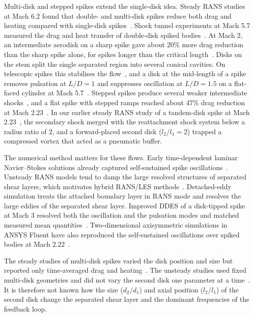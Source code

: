 \documentclass[11pt,a4paper]{article}
\newcommand{\ltl}{l_2/l_1}
\newcommand{\dtd}{d_2/d_1}
\begin{document}
Multi-disk and stepped spikes extend the single-disk idea. Steady RANS studies at Mach 6.2 found that double- and multi-disk spikes reduce both drag and heating compared with single-disk spikes~\cite{Yadav2013aerothermodynamics,Yadav2018numerical}. Shock tunnel experiments at Mach 5.7 measured the drag and heat transfer of double-disk spiked bodies~\cite{Narayana2019experimental,Narayana2023drag}. At Mach 2, an intermediate aerodisk on a sharp spike gave about 20\% more drag reduction than the sharp spike alone, for spikes longer than the critical length~\cite{Tembhurnikar2020effect,Jadhav2024effect}. Disks on the stem split the single separated region into several conical cavities. On telescopic spikes this stabilises the flow~\cite{Kobayashi2007experimental}, and a disk at the mid-length of a spike removes pulsation at $L/D = 1$ and suppresses oscillation at $L/D = 1.5$ on a flat-faced cylinder at Mach 5.7~\cite{Narayana2020attenuation}. Stepped spikes produce several weaker intermediate shocks~\cite{Kumar2022stepped}, and a flat spike with stepped ramps reached about 47\% drag reduction at Mach 2.23~\cite{Vijay2026numerical}. In our earlier steady RANS study of a tandem-disk spike at Mach 2.23~\cite{Gujar2026staged}, the secondary shock merged with the reattachment shock system below a radius ratio of 2, and a forward-placed second disk ($\ltl = 2$) trapped a compressed vortex that acted as a pneumatic buffer.

The numerical method matters for these flows. Early time-dependent laminar Navier--Stokes solutions already captured self-sustained spike oscillations~\cite{Shang1982flow}. Unsteady RANS models tend to damp the large resolved structures of separated shear layers, which motivates hybrid RANS/LES methods~\cite{Chaouat2017the}. Detached-eddy simulation treats the attached boundary layer in RANS mode and resolves the large eddies of the separated shear layer. Improved DDES of a disk-tipped spike at Mach 3 resolved both the oscillation and the pulsation modes and matched measured mean quantities~\cite{XUE2018detachededdy}. Two-dimensional axisymmetric simulations in ANSYS Fluent have also reproduced the self-sustained oscillations over spiked bodies at Mach 2.22~\cite{Konstantin2018numerical}.

The steady studies of multi-disk spikes varied the disk position and size but reported only time-averaged drag and heating~\cite{Yadav2013aerothermodynamics,Yadav2018numerical,Gujar2026staged}. The unsteady studies used fixed multi-disk geometries and did not vary the second disk one parameter at a time~\cite{Kobayashi2007experimental,Narayana2020attenuation}. It is therefore not known how the size ($\dtd$) and axial position ($\ltl$) of the second disk change the separated shear layer and the dominant frequencies of the feedback loop.
\end{document}
